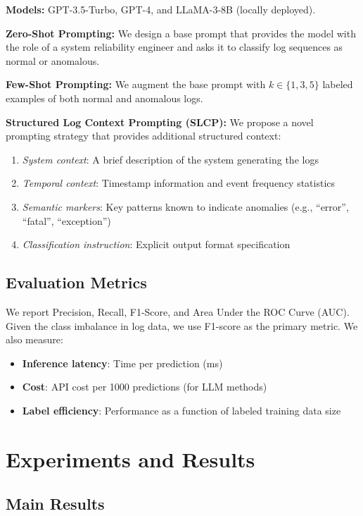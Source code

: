 \documentclass[conference]{IEEEtran}
\begin{document}
\textbf{Models:} GPT-3.5-Turbo, GPT-4, and LLaMA-3-8B (locally deployed).

\textbf{Zero-Shot Prompting:} We design a base prompt that provides the model with the role of a system reliability engineer and asks it to classify log sequences as normal or anomalous.

\textbf{Few-Shot Prompting:} We augment the base prompt with $k \in \{1, 3, 5\}$ labeled examples of both normal and anomalous logs.

\textbf{Structured Log Context Prompting (SLCP):} We propose a novel prompting strategy that provides additional structured context:
\begin{enumerate}
    \item \textit{System context}: A brief description of the system generating the logs
    \item \textit{Temporal context}: Timestamp information and event frequency statistics
    \item \textit{Semantic markers}: Key patterns known to indicate anomalies (e.g., ``error'', ``fatal'', ``exception'')
    \item \textit{Classification instruction}: Explicit output format specification
\end{enumerate}

\subsection{Evaluation Metrics}

We report Precision, Recall, F1-Score, and Area Under the ROC Curve (AUC). Given the class imbalance in log data, we use F1-score as the primary metric. We also measure:

\begin{itemize}
    \item \textbf{Inference latency}: Time per prediction (ms)
    \item \textbf{Cost}: API cost per 1000 predictions (for LLM methods)
    \item \textbf{Label efficiency}: Performance as a function of labeled training data size
\end{itemize}

\section{Experiments and Results}

\subsection{Main Results}
\end{document}

